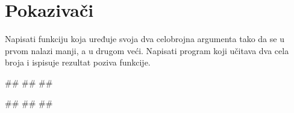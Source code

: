 
\section{Pokazivači}


\begin{Exercise}[label=v2.2_01] 
Napisati funkciju koja uređuje svoja dva celobrojna argumenta tako da se u prvom nalazi manji, a u drugom veći. Napisati program koji učitava dva cela broja i ispisuje rezultat poziva funkcije. 

\begin{miditest}
\begin{upotreba}{1}
#\naslovInt#
##
##
\end{upotreba}
\end{miditest}
\begin{miditest}
\begin{upotreba}{2}
#\naslovInt#
##
##
\end{upotreba}
\end{miditest}

\end{Exercise}
\ifresenja
\begin{Answer}[ref=v2.2_01]
\end{Answer}
 \fi

